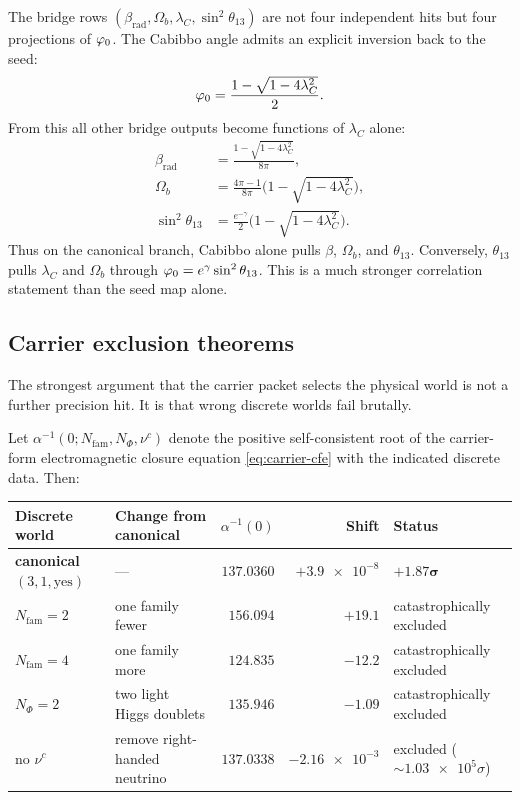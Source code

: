 The bridge rows $(\beta_{\mathrm{rad}},\Omega_b,\lambda_C,\sin^2\theta_{13})$ are not four independent hits but four projections of $\varphi_0$. The Cabibbo angle admits an explicit inversion back to the seed:
\begin{equation}
\label{eq:cabibbo-inversion}
\varphi_0=\frac{1-\sqrt{1-4\lambda_C^2}}{2}.
\end{equation}
From this all other bridge outputs become functions of $\lambda_C$ alone:
\begin{equation}
\label{eq:lambda-c-master}
\begin{aligned}
\beta_{\mathrm{rad}}&=\frac{1-\sqrt{1-4\lambda_C^2}}{8\pi},\\
\Omega_b&=\frac{4\pi-1}{8\pi}\bigl(1-\sqrt{1-4\lambda_C^2}\bigr),\\
\sin^2\theta_{13}&=\frac{e^{-\gamma}}{2}\bigl(1-\sqrt{1-4\lambda_C^2}\bigr).
\end{aligned}
\end{equation}
Thus on the canonical branch, Cabibbo alone pulls $\beta$, $\Omega_b$, and $\theta_{13}$. Conversely, $\theta_{13}$ pulls $\lambda_C$ and $\Omega_b$ through $\varphi_0=e^\gamma\sin^2\theta_{13}$. This is a much stronger correlation statement than the seed map alone.

\subsection{Carrier exclusion theorems}

The strongest argument that the carrier packet selects the physical world is not a further precision hit. It is that wrong discrete worlds fail brutally.

\begin{theorem}
\label{thm:carrier-exclusion}
Let $\alpha^{-1}(0;N_{\mathrm{fam}},N_\Phi,\nu^c)$ denote the positive self-consistent root of the carrier-form electromagnetic closure equation \eqref{eq:carrier-cfe} with the indicated discrete data. Then:
\begin{center}
\small
\begin{tabular}{@{}llrrl@{}}
\toprule
Discrete world & Change from canonical & $\alpha^{-1}(0)$ & Shift & Status \\
\midrule
\textbf{canonical $(3,1,\text{yes})$} & --- & $\mathbf{\num{137.0360}}$ & $+\num{3.9e-8}$ & $\mathbf{+1.87\sigma}$ \\
$N_{\mathrm{fam}}=2$ & one family fewer & $\num{156.094}$ & $+19.1$ & catastrophically excluded \\
$N_{\mathrm{fam}}=4$ & one family more & $\num{124.835}$ & $-12.2$ & catastrophically excluded \\
$N_\Phi=2$ & two light Higgs doublets & $\num{135.946}$ & $-1.09$ & catastrophically excluded \\
no $\nu^c$ & remove right-handed neutrino & $\num{137.0338}$ & $-\num{2.16e-3}$ & excluded (${\sim}\num{1.03e5}\sigma$) \\
\bottomrule
\end{tabular}
\end{center}
\end{theorem}

